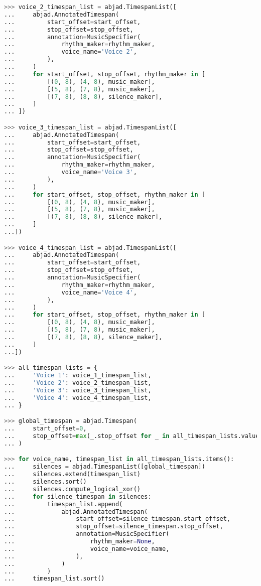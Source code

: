 \begin{lstlisting}[language=Python, caption=Demonstration of AttachmentHandlers]
>>> voice_2_timespan_list = abjad.TimespanList([
...     abjad.AnnotatedTimespan(
...         start_offset=start_offset,
...         stop_offset=stop_offset,
...         annotation=MusicSpecifier(
...             rhythm_maker=rhythm_maker,
...             voice_name='Voice 2',
...         ),
...     )
...     for start_offset, stop_offset, rhythm_maker in [
...         [(0, 8), (4, 8), music_maker],
...         [(5, 8), (7, 8), music_maker],
...         [(7, 8), (8, 8), silence_maker],
...     ]
... ])

>>> voice_3_timespan_list = abjad.TimespanList([
...     abjad.AnnotatedTimespan(
...         start_offset=start_offset,
...         stop_offset=stop_offset,
...         annotation=MusicSpecifier(
...             rhythm_maker=rhythm_maker,
...             voice_name='Voice 3',
...         ),
...     )
...     for start_offset, stop_offset, rhythm_maker in [
...         [(0, 8), (4, 8), music_maker],
...         [(5, 8), (7, 8), music_maker],
...         [(7, 8), (8, 8), silence_maker],
...     ]
...])

>>> voice_4_timespan_list = abjad.TimespanList([
...     abjad.AnnotatedTimespan(
...         start_offset=start_offset,
...         stop_offset=stop_offset,
...         annotation=MusicSpecifier(
...             rhythm_maker=rhythm_maker,
...             voice_name='Voice 4',
...         ),
...     )
...     for start_offset, stop_offset, rhythm_maker in [
...         [(0, 8), (4, 8), music_maker],
...         [(5, 8), (7, 8), music_maker],
...         [(7, 8), (8, 8), silence_maker],
...     ]
...])

>>> all_timespan_lists = {
...     'Voice 1': voice_1_timespan_list,
...     'Voice 2': voice_2_timespan_list,
...     'Voice 3': voice_3_timespan_list,
...     'Voice 4': voice_4_timespan_list,
... }

>>> global_timespan = abjad.Timespan(
...     start_offset=0,
...     stop_offset=max(_.stop_offset for _ in all_timespan_lists.values())
... )

>>> for voice_name, timespan_list in all_timespan_lists.items():
...     silences = abjad.TimespanList([global_timespan])
...     silences.extend(timespan_list)
...     silences.sort()
...     silences.compute_logical_xor()
...     for silence_timespan in silences:
...         timespan_list.append(
...             abjad.AnnotatedTimespan(
...                 start_offset=silence_timespan.start_offset,
...                 stop_offset=silence_timespan.stop_offset,
...                 annotation=MusicSpecifier(
...                     rhythm_maker=None,
...                     voice_name=voice_name,
...                 ),
...             )
...         )
...     timespan_list.sort()


\end{lstlisting}
